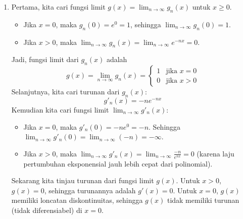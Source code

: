 \documentclass[12pt,openany,a4paper]{article}
\newtheorem*{teorema}{Teorema}
\begin{document}
\begin{enumerate}
    \begin{teorema}
        Barisan fungsi $(f_n)$ konvergen seragam ke $f$ pada $A$ jika dan hanya jika $\lim_{n \to \infty} M_n = 0$, dengan $M_n = \sup_{x \in A} |f_n(x) - f(x)|$.
    \end{teorema}
    Untuk menunjukkan konvergensi seragam berdasarkan definisi tersebut, kita perlu meninjau nilai supremum dari selisih $|f_n(x) - f(x)|$ pada interval $[0,\infty)$.
    \[M_n = \sup_{x \ge 0} |xe^{-nx} - 0| = \sup_{x \ge 0} (xe^{-nx})\]
    Untuk mencari supremum, kita dapat menggunakan alat kalkulus dasar, yaitu mencari nilai maksimum fungsi dengan meninjau turunan pertamanya. Misalkan $g_n(x) = xe^{-nx}$, kita akan cari titik kritis dimana turunannya bernilai $0$:
    \[g_n'(x) = e^{-nx} + x(-n)e^{-nx} = e^{-nx}(1-nx)\]
    Nilai stasioner dicapai saat $g_n'(x) = 0$:
    \[e^{-nx}(1-nx) = 0 \implies 1-nx = 0 \implies x = \frac{1}{n}\]
    Karena $g_n'(x) > 0$ untuk $0 \le x < \frac{1}{n}$ dan $g_n'(x) < 0$ untuk $x > \frac{1}{n}$, maka terbukti bahwa $g_n(x)$ mencapai nilai maksimum global di titik $x = \frac{1}{n}$.
    Nilai maksimumnya adalah
    \[M_n = g_n\left(\frac{1}{n}\right) = \left(\frac{1}{n}\right) e^{-n(1/n)} = \frac{1}{ne}\]
    Selanjutnya, kita evaluasi limit dari $M_n$ saat $n \to \infty$:
    \[\lim_{n \to \infty} M_n = \lim_{n \to \infty} \frac{1}{ne} = 0\]
    Karena $\lim_{n \to \infty} M_n = 0$, maka terbukti bahwa barisan fungsi $(f_n)$ \textbf{konvergen secara seragam} ke $f(x)=0$ pada $[0,\infty)$.
    
    \item 
    Pertama, kita cari fungsi limit $g(x) = \lim_{n \to \infty} g_n(x)$ untuk $x \ge 0$.
    \begin{itemize}
        \item Jika $x = 0$, maka $g_n(0) = e^0 = 1$, sehingga $\lim_{n \to \infty} g_n(0) = 1$.
        \item Jika $x > 0$, maka $\lim_{n \to \infty} g_n(x) = \lim_{n \to \infty} e^{-nx} = 0$.
    \end{itemize}
    Jadi, fungsi limit dari $g_n(x)$ adalah
    \[g(x) = \lim_{n \to \infty} g_n(x) = \begin{cases} 1 & \text{jika } x = 0 \\ 0 & \text{jika } x > 0 \end{cases}\]
    Selanjutnya, kita cari turunan dari $g_n(x)$:
    \[g'_n(x) = -n e^{-nx}\]
    Kemudian kita cari fungsi limit $\lim_{n \to \infty} g'_n(x)$:
    \begin{itemize}
        \item Jika $x = 0$, maka $g'_n(0) = -n e^0 = -n$. Sehingga $\lim_{n \to \infty} g'_n(0) = \lim_{n \to \infty} (-n) = -\infty$.
        \item Jika $x > 0$, maka $\lim_{n \to \infty} g'_n(x) = \lim_{n \to \infty} \frac{-n}{e^{nx}} = 0$ (karena laju pertumbuhan eksponensial jauh lebih cepat dari polinomial).
    \end{itemize}
    Sekarang kita tinjau turunan dari fungsi limit $g(x)$.
    Untuk $x > 0$, $g(x) = 0$, sehingga turunannya adalah $g'(x) = 0$.
    Untuk $x = 0$, $g(x)$ memiliki loncatan diskontinuitas, sehingga $g(x)$ tidak memiliki turunan (tidak diferensiabel) di $x = 0$.
    

\end{enumerate}
\end{document}

